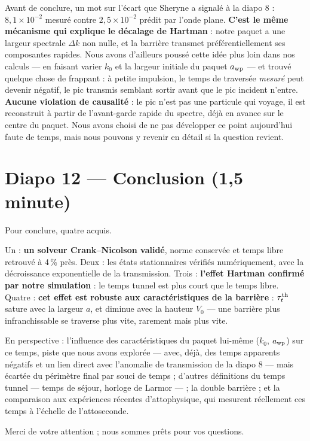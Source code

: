 \documentclass[11pt,a4paper]{article}
\newcommand{\diapo}[2]{\section*{Diapo #1 --- #2}}
\begin{document}
Avant de conclure, un mot sur l'écart que Sheryne a signalé à la diapo 8 :
$8{,}1\times10^{-2}$ mesuré contre $2{,}5\times10^{-2}$ prédit par l'onde
plane. \textbf{C'est le même mécanisme qui explique le décalage de Hartman} :
notre paquet a une largeur spectrale $\Delta k$ non nulle, et la barrière
transmet préférentiellement ses composantes rapides. Nous avons d'ailleurs
poussé cette idée plus loin dans nos calculs --- en faisant varier $k_0$ et
la largeur initiale du paquet $a_{\rm wp}$ --- et trouvé quelque chose de
frappant : à petite impulsion, le temps de traversée \emph{mesuré} peut
devenir négatif, le pic transmis semblant sortir avant que le pic incident
n'entre. \textbf{Aucune violation de causalité} : le pic n'est pas une
particule qui voyage, il est reconstruit à partir de l'avant-garde rapide du
spectre, déjà en avance sur le centre du paquet. Nous avons choisi de ne pas
développer ce point aujourd'hui faute de temps, mais nous pouvons y revenir
en détail si la question revient.

\diapo{12}{Conclusion (1,5 minute)}

Pour conclure, quatre acquis.

Un : \textbf{un solveur Crank--Nicolson validé}, norme conservée et temps libre
retrouvé à 4\,\% près. Deux : les états stationnaires vérifiés numériquement,
avec la décroissance exponentielle de la transmission. Trois :
\textbf{l'effet Hartman confirmé par notre simulation} : le temps tunnel est plus
court que le temps libre. Quatre : \textbf{cet effet est robuste aux
caractéristiques de la barrière} : $\tau_t^{\rm th}$ sature avec la largeur
$a$, et diminue avec la hauteur $V_0$ --- une barrière plus infranchissable se
traverse plus vite, rarement mais plus vite.

En perspective : l'influence des caractéristiques du paquet lui-même ($k_0$,
$a_{\rm wp}$) sur ce temps, piste que nous avons explorée --- avec, déjà, des
temps apparents négatifs et un lien direct avec l'anomalie de transmission de
la diapo 8 --- mais écartée du périmètre final par souci de temps ; d'autres
définitions du temps tunnel --- temps de séjour, horloge de Larmor --- ; la
double barrière ; et la comparaison aux expériences récentes d'attophysique,
qui mesurent réellement ces temps à l'échelle de l'attoseconde.

Merci de votre attention ; nous sommes prêts pour vos questions.

\clearpage
\end{document}

